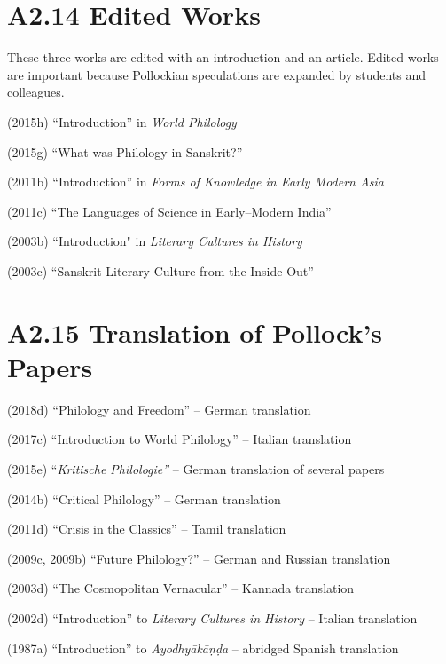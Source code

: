\newpage

\section*{A2.14 Edited Works}

These three works are edited with an introduction and an article. Edited works are important because Pollockian speculations are expanded by students and colleagues.

(2015h) “Introduction” in \textit{World Philology}

(2015g) “What was Philology in Sanskrit?”

(2011b) “Introduction” in \textit{Forms of Knowledge in Early Modern Asia}

(2011c) “The Languages of Science in Early–Modern India”

(2003b) “Introduction" in \textit{Literary Cultures in History}

(2003c) “Sanskrit Literary Culture from the Inside Out”

\vspace{-.3cm}

\section*{A2.15 Translation of Pollock’s Papers}

(2018d) “Philology and Freedom” – German translation

(2017c) “Introduction to World Philology” – Italian translation

(2015e) “\textit{Kritische Philologie”} – German translation of several  papers

(2014b) “Critical Philology” – German translation

(2011d) “Crisis in the Classics” – Tamil translation

(2009c, 2009b) “Future Philology?” – German and Russian translation

(2003d) “The Cosmopolitan Vernacular” – Kannada translation

(2002d) “Introduction” to \textit{Literary Cultures in History} – Italian translation

(1987a) “Introduction” to \textit{Ayodhyākāṇḍa} – abridged Spanish translation

